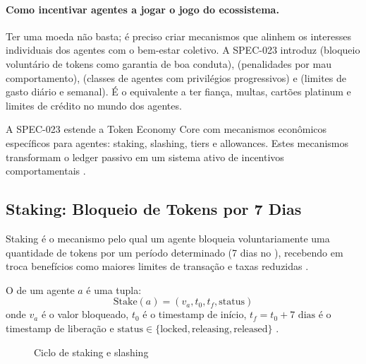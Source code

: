 \paragraph{Como incentivar agentes a jogar o jogo do ecossistema.} Ter uma moeda não basta; é preciso criar mecanismos que alinhem os interesses individuais dos agentes com o bem-estar coletivo. A SPEC-023 introduz  (bloqueio voluntário de tokens como garantia de boa conduta),  (penalidades por mau comportamento),  (classes de agentes com privilégios progressivos) e  (limites de gasto diário e semanal). É o equivalente a ter fiança, multas, cartões platinum e limites de crédito no mundo dos agentes.

A SPEC-023 estende a Token Economy Core com mecanismos econômicos
específicos para agentes: staking, slashing, tiers e allowances.
Estes mecanismos transformam o ledger passivo em um sistema ativo
de incentivos comportamentais \cite{opencode2026token}.

\subsection{Staking: Bloqueio de Tokens por 7 Dias}

Staking é o mecanismo pelo qual um agente bloqueia voluntariamente
uma quantidade de tokens por um período determinado (7 dias no
\opencodeeco{}), recebendo em troca benefícios como maiores
limites de transação e taxas reduzidas \cite{opencode2026token,
buterin2014next}.

\begin{definicao}[Staking]
O  de um agente $a$ é uma tupla:
\[
\text{Stake}(a) = (v_a, t_0, t_f, \text{status})
\]
onde $v_a$ é o valor bloqueado, $t_0$ é o timestamp de início,
$t_f = t_0 + 7\text{ dias}$ é o timestamp de liberação e
$\text{status} \in \{\text{locked}, \text{releasing}, \text{released}\}$
\cite{opencode2026token}.
\end{definicao}

\begin{figure}[htb]
\centering
\caption{Ciclo de staking e slashing}
\label{fig:staking-slashing}
\end{figure}


